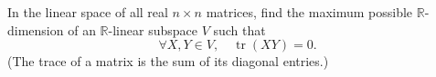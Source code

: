 \begin{problem}
    In the linear space of all real \( n \times n \) matrices, find the maximum possible \( \mathbb{R} \)-dimension of an \( \mathbb{R} \)-linear subspace \( V \) such that
    \[
        \forall X, Y \in V, \quad \operatorname{tr}\left(XY\right) = 0.
    \]
    (The trace of a matrix is the sum of its diagonal entries.)
\end{problem}
